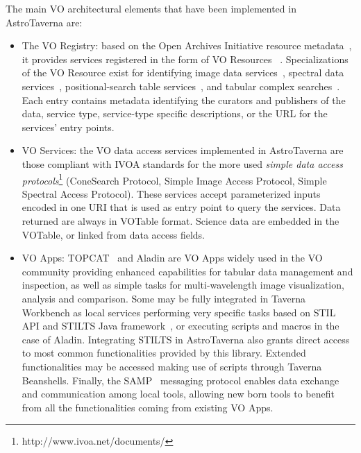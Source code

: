 \documentclass[final,authoryear,5p,times,twocolumn]{elsarticle}
\begin{document}
The main VO architectural elements that have been implemented in AstroTaverna are:

\begin{itemize}
\item The VO Registry: based on the Open Archives Initiative resource metadata~\citep{2002OAI-PMH},  it provides services registered in the form of VO Resources ~\citep{Hanisch2007}. Specializations of the VO Resource exist for identifying image data services~\citep[Simple Image Access Protocol;][]{Tody2009}, spectral data services~\citep[Simple Spectral Access Protocol;][]{Tody2012}, positional-search table services~\citep[ConeSearch Protocol;][]{Williams2008}, and tabular complex searches~\citep[Tabular Access Protocol;][]{Dowler2010}. Each entry contains metadata identifying the curators and publishers of the data, service type, service-type specific descriptions, or the URL for the services’ entry points. 

\item VO Services: the VO data access services implemented in AstroTaverna are those compliant with IVOA standards for the more used \textit{simple data access protocols}\footnote{http://www.ivoa.net/documents/} (ConeSearch Protocol, Simple Image Access Protocol, Simple Spectral Access Protocol). These services accept parameterized inputs encoded in one URI that is used as entry point to query the services. Data returned are always in VOTable format. Science data are embedded in the VOTable, or linked from data access fields.

\item VO Apps: TOPCAT~\citep{Taylor2011} and Aladin are VO Apps widely used in the VO community providing enhanced capabilities for tabular data management and inspection, as well as simple tasks for multi-wavelength image visualization, analysis and comparison. Some may be fully integrated in Taverna Workbench as local services performing very specific tasks based on STIL API and STILTS Java framework~\citep{Taylor2006,STILTS2011}, or executing scripts and macros in the case of Aladin. Integrating STILTS in AstroTaverna also grants direct access to most common functionalities provided by this library. Extended functionalities may be accessed making use of scripts through Taverna Beanshells. Finally, the SAMP~\citep[Simple Application Messaging Protocol;][]{Taylor2012} messaging protocol enables data exchange and communication among local tools, allowing new born tools to benefit from all the functionalities coming from existing VO Apps.
\end{itemize}
\end{document}

